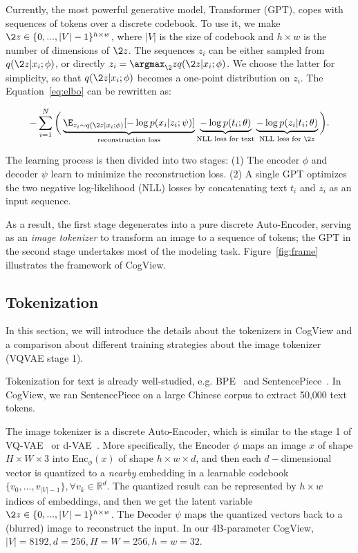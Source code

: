 Currently, the most powerful generative model, Transformer (GPT), copes with sequences of tokens over a discrete codebook. To use it, we make $\2z \in \{0,...,|V|-1\}^{h\times w}$, where $|V|$ is the size of codebook and $h\times w$ is the number of dimensions of $\2z$. The sequences $z_i$ can be either sampled from $q(\2z|x_i;\phi)$, or directly $z_i=\argmax_\2z q(\2z|x_i;\phi)$. We choose the latter for simplicity, so that $q(\2z|x_i;\phi)$ becomes a one-point distribution on $z_i$. The Equation~\eqref{eq:elbo} can be rewritten as:

\begin{align}
  -\sum_{i=1}^N\bigg(\underbrace{\E_{z_i\sim q(\2z|x_i;\phi)}[-\log p(x_i|z_i;\psi)]}_{\text{reconstruction loss}} \underbrace{-\log p(t_i;\theta)}_{\text{NLL loss for text}}
  \underbrace{-\log p(z_i| t_i; \theta)}_{\text{NLL loss for $\2z$}}\bigg).\label{eq:vqvae}
\end{align}

The learning process is then divided into two stages: (1) The encoder $\phi$ and decoder $\psi$ learn to minimize the reconstruction loss. (2) A single GPT optimizes the two negative log-likelihood (NLL) losses by concatenating text $t_i$ and $z_i$ as an input sequence.  

As a result, the first stage degenerates into a pure discrete Auto-Encoder, serving as an \emph{image tokenizer} to transform an image to a sequence of tokens; the GPT in the second stage undertakes most of the modeling task. Figure~\ref{fig:frame} illustrates the framework of CogView.\label{sec:theory}

\subsection{Tokenization}\label{sec:tokenizer}
In this section, we will introduce the details about the tokenizers in CogView and a comparison about different training strategies about the image tokenizer (VQVAE stage 1). 

Tokenization for text is already well-studied, e.g. BPE~\cite{gage1994new} and SentencePiece~\cite{kudo-richardson-2018-sentencepiece}. In CogView,  we ran SentencePiece on a large Chinese corpus to extract 50,000 text tokens. 

The image tokenizer is a discrete Auto-Encoder, which is similar to the stage 1 of VQ-VAE~\cite{van2017neural} or d-VAE~\cite{ramesh2021zero}. More specifically, the Encoder $\phi$ maps an image $x$ of shape $H\times W\times 3$ into $\text{Enc}_{\phi}(x)$  of shape $ h \times w \times d$, and then each $d-$dimensional vector is quantized to a \emph{nearby} embedding in a learnable codebook $\{v_0, ..., v_{|V|-1}\}, \forall v_k \in \mathbb{R}^{d}$. The quantized result can be represented by $h\times w$ indices of embeddings, and then we get the latent variable $\2z \in \{0,...,|V|-1\}^{h\times w}$. The Decoder $\psi$ maps the quantized vectors back to a (blurred) image to reconstruct the input. In our 4B-parameter CogView, $|V|=8192, d=256, H=W=256, h=w=32$. 

